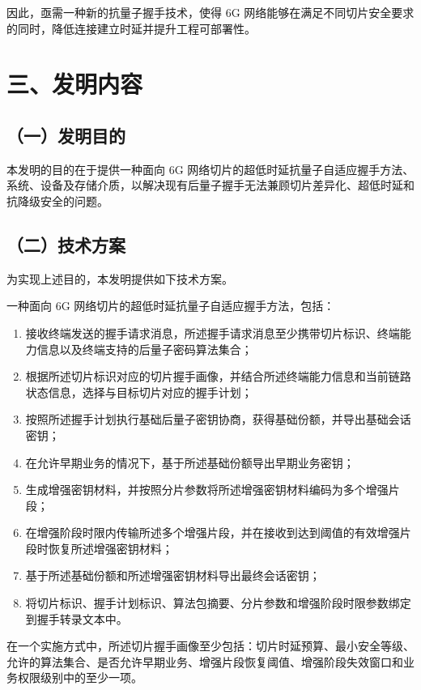 \documentclass[12pt,a4paper]{article}
\begin{document}
因此，亟需一种新的抗量子握手技术，使得 6G 网络能够在满足不同切片安全要求的同时，降低连接建立时延并提升工程可部署性。

\section*{三、发明内容}

\subsection*{（一）发明目的}

本发明的目的在于提供一种面向 6G 网络切片的超低时延抗量子自适应握手方法、系统、设备及存储介质，以解决现有后量子握手无法兼顾切片差异化、超低时延和抗降级安全的问题。

\subsection*{（二）技术方案}

为实现上述目的，本发明提供如下技术方案。

一种面向 6G 网络切片的超低时延抗量子自适应握手方法，包括：

\begin{enumerate}[leftmargin=2em]
    \item 接收终端发送的握手请求消息，所述握手请求消息至少携带切片标识、终端能力信息以及终端支持的后量子密码算法集合；
    \item 根据所述切片标识对应的切片握手画像，并结合所述终端能力信息和当前链路状态信息，选择与目标切片对应的握手计划；
    \item 按照所述握手计划执行基础后量子密钥协商，获得基础份额，并导出基础会话密钥；
    \item 在允许早期业务的情况下，基于所述基础份额导出早期业务密钥；
    \item 生成增强密钥材料，并按照分片参数将所述增强密钥材料编码为多个增强片段；
    \item 在增强阶段时限内传输所述多个增强片段，并在接收到达到阈值的有效增强片段时恢复所述增强密钥材料；
    \item 基于所述基础份额和所述增强密钥材料导出最终会话密钥；
    \item 将切片标识、握手计划标识、算法包摘要、分片参数和增强阶段时限参数绑定到握手转录文本中。
\end{enumerate}

在一个实施方式中，所述切片握手画像至少包括：切片时延预算、最小安全等级、允许的算法集合、是否允许早期业务、增强片段恢复阈值、增强阶段失效窗口和业务权限级别中的至少一项。
\end{document}
